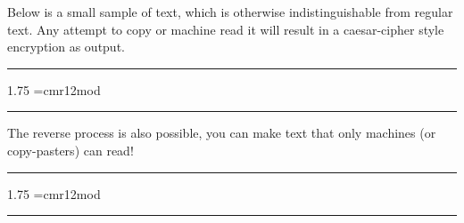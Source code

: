 \documentclass{article}
\newcommand{\linebox}[1]
{
  \vspace{2em}\hrule\vspace{1em}
  \scalebox
  {1.75}
  {\Large\font\test=cmr12mod \test #1}

  \vspace{1em}\hrule\vspace{2em}
}
\begin{document}
\Large\noindent
Below is a small sample of text, which is otherwise 
indistinguishable from regular text. 
Any attempt to copy or machine read it will
result in a caesar-cipher style encryption as output.

\linebox{}

\noindent
The reverse process is also possible, you can make text that only machines (or copy-pasters) can read!

\linebox{}
\end{document}

